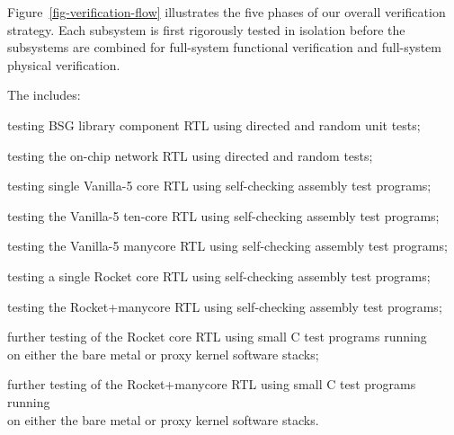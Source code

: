 

Figure~\ref{fig-verification-flow} illustrates the five phases
of our overall verification strategy. Each subsystem is first rigorously
tested in isolation before the subsystems are combined for full-system
functional verification and full-system physical verification.

\medskip
\begin{cbxlist}{1.5em}{1em}{1em}

 \item The 
    includes:

    \smallskip
    \begin{cbxlist}[--]{1.5em}{0em}{0em}
      \raggedright

      \item testing BSG library component RTL using directed and random
         unit tests;
      \item testing the on-chip network RTL using directed and random
         tests;

      \item testing single Vanilla-5 core RTL using self-checking
         assembly test programs;

      \item testing the Vanilla-5 ten-core RTL using self-checking
         assembly test programs;

      \item testing the Vanilla-5 manycore RTL using self-checking
         assembly test programs;

      \item testing a single Rocket core RTL using self-checking
         assembly test programs;

      \item testing the Rocket+manycore RTL using self-checking assembly
         test programs;

      \item further testing of the Rocket core RTL using small C test
         programs running \\\hspace{0.5em}on either the bare metal or
         proxy kernel software stacks;

      \item further testing of the Rocket+manycore RTL using small C test
         programs running \\\hspace{0.5em}on either the bare metal or
         proxy kernel software stacks.


\end{cbxlist}
\end{cbxlist}
